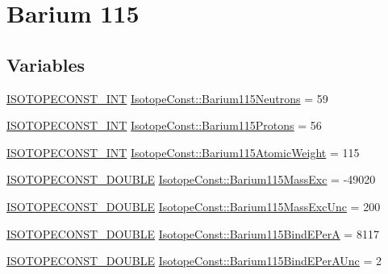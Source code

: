 \hypertarget{group___isotope_const-_barium-_ba115}{}\section{Barium 115}
\label{group___isotope_const-_barium-_ba115}
\subsection*{Variables}
\begin{DoxyCompactItemize}
\item 
\mbox{\hyperlink{group___isotope_const-_macros_ga5f18360b3e99483a35c32d789e62621c}{I\+S\+O\+T\+O\+P\+E\+C\+O\+N\+S\+T\+\_\+\+I\+NT}} \mbox{\hyperlink{group___isotope_const-_barium-_ba115_ga9661acb7080777b4071e690f20d06155}{Isotope\+Const\+::\+Barium115\+Neutrons}} = 59
\item 
\mbox{\hyperlink{group___isotope_const-_macros_ga5f18360b3e99483a35c32d789e62621c}{I\+S\+O\+T\+O\+P\+E\+C\+O\+N\+S\+T\+\_\+\+I\+NT}} \mbox{\hyperlink{group___isotope_const-_barium-_ba115_ga52f793fb7bcf6d774c15a76118316223}{Isotope\+Const\+::\+Barium115\+Protons}} = 56
\item 
\mbox{\hyperlink{group___isotope_const-_macros_ga5f18360b3e99483a35c32d789e62621c}{I\+S\+O\+T\+O\+P\+E\+C\+O\+N\+S\+T\+\_\+\+I\+NT}} \mbox{\hyperlink{group___isotope_const-_barium-_ba115_ga5ffb6f535c61ca44d2b1c18413969cd8}{Isotope\+Const\+::\+Barium115\+Atomic\+Weight}} = 115
\item 
\mbox{\hyperlink{group___isotope_const-_macros_ga8f45a7272ce02c0b4c65c44636ed719a}{I\+S\+O\+T\+O\+P\+E\+C\+O\+N\+S\+T\+\_\+\+D\+O\+U\+B\+LE}} \mbox{\hyperlink{group___isotope_const-_barium-_ba115_gad23a85b48de2c33b8a78d6af9d317b28}{Isotope\+Const\+::\+Barium115\+Mass\+Exc}} = -\/49020
\item 
\mbox{\hyperlink{group___isotope_const-_macros_ga8f45a7272ce02c0b4c65c44636ed719a}{I\+S\+O\+T\+O\+P\+E\+C\+O\+N\+S\+T\+\_\+\+D\+O\+U\+B\+LE}} \mbox{\hyperlink{group___isotope_const-_barium-_ba115_ga7b852a1106ec3f910e84ebc95cc28f88}{Isotope\+Const\+::\+Barium115\+Mass\+Exc\+Unc}} = 200
\item 
\mbox{\hyperlink{group___isotope_const-_macros_ga8f45a7272ce02c0b4c65c44636ed719a}{I\+S\+O\+T\+O\+P\+E\+C\+O\+N\+S\+T\+\_\+\+D\+O\+U\+B\+LE}} \mbox{\hyperlink{group___isotope_const-_barium-_ba115_ga1fcefa09365633c714649f81ff866ed3}{Isotope\+Const\+::\+Barium115\+Bind\+E\+PerA}} = 8117
\item 
\mbox{\hyperlink{group___isotope_const-_macros_ga8f45a7272ce02c0b4c65c44636ed719a}{I\+S\+O\+T\+O\+P\+E\+C\+O\+N\+S\+T\+\_\+\+D\+O\+U\+B\+LE}} \mbox{\hyperlink{group___isotope_const-_barium-_ba115_gabba7cf1d681f8d810f33d7f71363fe4e}{Isotope\+Const\+::\+Barium115\+Bind\+E\+Per\+A\+Unc}} = 2

\end{DoxyCompactItemize}
